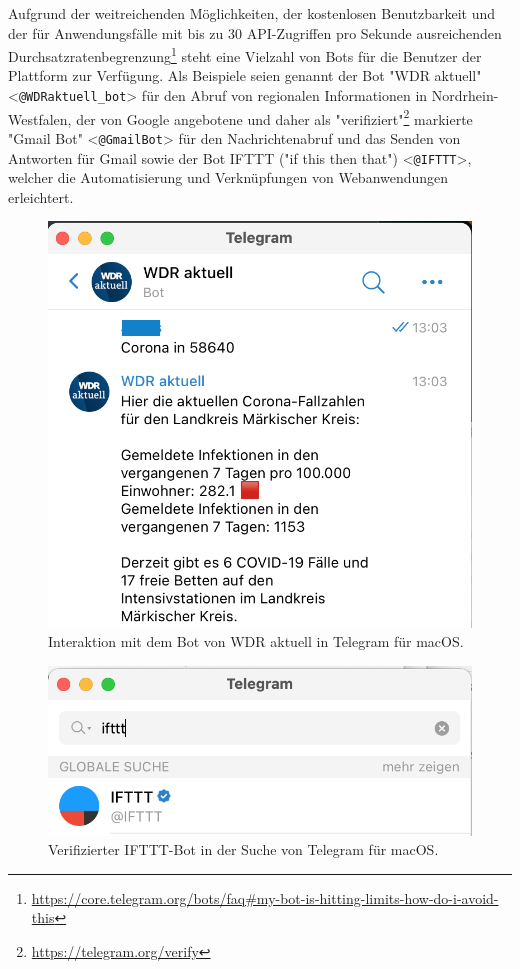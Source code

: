 Aufgrund der weitreichenden Möglichkeiten, der kostenlosen Benutzbarkeit und der für Anwendungsfälle mit bis zu 30 API-Zugriffen pro Sekunde ausreichenden Durchsatzratenbegrenzung\footnote{\url{https://core.telegram.org/bots/faq\#my-bot-is-hitting-limits-how-do-i-avoid-this}} steht eine Vielzahl von Bots für die Benutzer der Plattform zur Verfügung. Als Beispiele seien genannt der Bot "WDR aktuell" <\lstinline{@WDRaktuell_bot}> für den Abruf von regionalen Informationen in Nordrhein-Westfalen, der von Google angebotene und daher als "verifiziert"\footnote{\url{https://telegram.org/verify}} markierte "Gmail Bot" <\lstinline{@GmailBot}> für den Nachrichtenabruf und das Senden von Antworten für Gmail sowie der Bot IFTTT ("if this then that") <\lstinline{@IFTTT}>, welcher die Automatisierung und Verknüpfungen von Webanwendungen erleichtert.

\begin{figure}[h!]
\centering
\includegraphics[scale=0.7]{telegram-bot-beispiel}
\caption{Interaktion mit dem Bot von WDR aktuell in Telegram für macOS.}
\end{figure}

\begin{figure}[h!]
\centering
\includegraphics[scale=0.7]{verified_ifttt_bot}
\caption{Verifizierter IFTTT-Bot in der Suche von Telegram für macOS.}
\end{figure}

